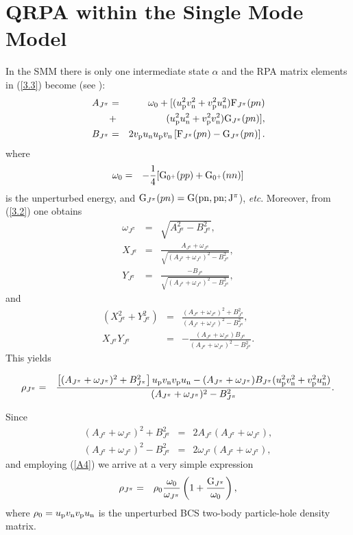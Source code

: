 \documentclass[nofootinbib,twocolumn,eqsecnum,floats,aps]{revtex4}
\def\nn{\nonumber }
\def\nn{\nonumber }
\def\br{\begin{eqnarray}}
\def\er{\end{eqnarray}}
\def\etc{ {\it etc}}
\def\rf#1{{(\ref{#1})}}
\def\a {{\alpha}}
\def\up{u_{{\rm p}}}
\def\vp{v_{{\rm p}}}
\def\un{u_{{\rm n}}}
\def\vn{v_{{\rm n}}}
\begin{document}
{\begin{acknowledgements}
\end{acknowledgements}

\appendix*
\section{QRPA within the Single Mode Model}\label{A}
In the SMM there is only one intermediate state $\a$ and the RPA
matrix elements in \rf{3.3}
become (see  \cite[Eqs.(28-31)]{Kr05}):
\begin{eqnarray}
A_{J^\pi}& =&\omega_0+[(\up^2\vn^2+\vp^2 \un^2) {\rm F}_{J^\pi}(pn)
\nn\\
&+&(\up^2\un^2+\vp^2\vn^2){\rm G}_{J^\pi}(pn)],
\nn\\
{B}_{J^\pi}&=&2\vp \un \up \vn \left[ {\rm F}_{J^\pi}(pn)- {\rm G}_{J^\pi}(pn) \right].
\label{A1} \end{eqnarray}
where
\br
\omega_0&=&-\frac{1}{4}[{\rm G}_{0^+}(pp)+{\rm G}_{0^+}(nn)]
\label{A2} \end{eqnarray}
is the unperturbed energy, and ${\rm G}_{J^\pi}(pn)={\rm G(pn,pn;J^\pi}$), \etc.
Moreover, from  \rf{3.2} one obtains
\br
\omega_{J^\pi}&=&\sqrt{A_{J^\pi}^2-B_{J^\pi}^2},
\nn\\
X_{J^\pi}&=&\frac{A_{J^\pi}+\omega_{J^\pi}}{\sqrt{(A_{J^\pi}+\omega_{J^\pi})^2-B_{J^\pi}^2}},
\nn\\
Y_{J^\pi}&=&\frac{-B_{J^\pi}}{\sqrt{(A_{J^\pi}+\omega_{J^\pi})^2-B_{J^\pi}^2}},
\label{A3} \end{eqnarray}
and
\br
( X^2_{J^\pi}+ Y^2_{J^\pi})&=&\frac{(A_{J^\pi}+\omega_{J^\pi})^2+B_{J^\pi}^2}{{(A_{J^\pi}+\omega_{J^\pi})^2-B^2_{J^\pi}}},
 \nn\\
X_{J^\pi} Y_{J^\pi}&=&-\frac{(A_{J^\pi}+\omega_{J^\pi})B_{J^\pi}}{{(A_{J^\pi}+\omega_{J^\pi})^2-B_{J^\pi}^2}}.
\label{A4}\er
This yields
\begin{widetext}
\br
{\rho}_{J^\pi}&=&\frac{\left[{{(A_{J^\pi}+\omega_{J^\pi})^2+B_{J^\pi}^2}}\right]\up\vn\vp\un
-(A_{J^\pi}+\omega_{J^\pi})B_{J^\pi}(\up^2\vn^2+\vp^2\un^2)}{{(A_{J^\pi}+\omega_{J^\pi})^2-B_{J^\pi}^2}}.
\label{A5}\er
\end{widetext}
Since
\br
(A_{J^\pi}+\omega_{J^\pi})^2+B_{J^\pi}^2&=&2A_{J^\pi}(A_{J^\pi}+\omega_{J^\pi}),
\nn\\
(A_{J^\pi}+\omega_{J^\pi})^2-B_{J^\pi}^2&=&2\omega_{J^\pi}(A_{J^\pi}+\omega_{J^\pi}),
\label{A6}\er
and employing \rf{A4} we arrive at a very simple expression
\br
{\rho}_{J^\pi}&=&\rho_0\frac{\omega_0}{\omega_{J^\pi}}\left(1+\frac{{\rm G}_{J^\pi}}{\omega_0}\right),
\label{A7}\er
where $\rho_0=\up\vn\vp\un$ is the unperturbed BCS two-body particle-hole density matrix.
}
\end{document}
